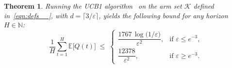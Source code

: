 \documentclass[12pt,draftcls, onecolumn]{IEEEtran}
\newcommand{\velb}{\varepsilon}
\newcommand{\vedisc}{\omega}
\newcommand{\EE}{\mathbb{E}}
\newtheorem{theorem}{Theorem}
\newtheorem{lemma}{Lemma}
\begin{document}
\begin{theorem}\label{thm:main_known}
Running the UCB1 algorithm~\cite{Auer2002FinitetimeAO} on the arm set \(\mathcal{K}\) defined in~\eqref{eqn:defs__}, with \(d = \lceil 3/\velb \rceil\), yields the following bound for any horizon \(H \in \mathbb{N}\):
\[
    \frac{1}{H}\sum_{t=1}^H \EE\bigl[Q(t)\bigr]
    \;\le\;
    \begin{cases}
        \dfrac{1767\,\log\!\bigl(1/\velb\bigr)}{\velb^{2}}, & \text{if } \varepsilon \le e^{-3},\\[1.25ex]
        \dfrac{12378}{\velb^{2}}, & \text{if } \varepsilon \ge e^{-3}.
    \end{cases}
\]
\end{theorem}




\end{document}
